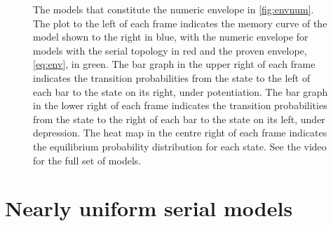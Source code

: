 \documentclass[12pt]{article}
\begin{document}
\begin{figure}[tbp]
  \centering
  \begin{myenuma}
  \item{}
  \item{}
  \item{}
  \item{}
  \item{}
  \item{}
  \end{myenuma}
  \caption[Optimal models]{The models that constitute the numeric envelope in \autoref{fig:envnum}.
  The plot to the left of each frame indicates the memory curve of the model shown to the right in blue, with the numeric envelope for models with the serial topology in red and the proven envelope, \eqref{eq:env}, in green.
  The bar graph in the upper right of each frame indicates the transition probabilities from the state to the left of each bar to the state on its right, under potentiation.
  The bar graph in the lower right of each frame indicates the transition probabilities from the state to the right of each bar to the state on its left, under depression.
  The heat map in the centre right of each frame indicates the equilibrium probability distribution for each state.
  See the video for the full set of models.}\label{fig:envvid}
\end{figure}



\section{Nearly uniform serial models}\label{sec:serial}
\end{document}
